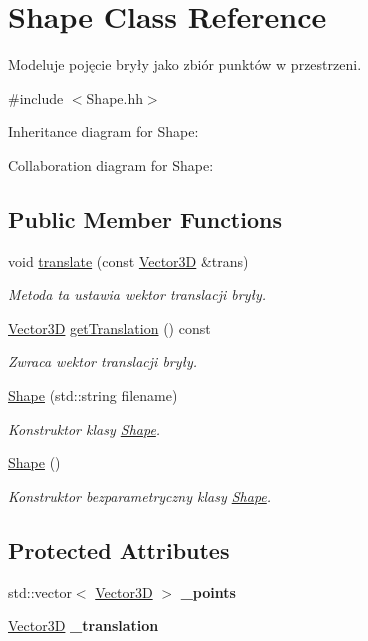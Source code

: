 \hypertarget{class_shape}{}\section{Shape Class Reference}
\label{class_shape}


Modeluje pojęcie bryły jako zbiór punktów w przestrzeni.  




{\ttfamily \#include $<$Shape.\+hh$>$}



Inheritance diagram for Shape\+:


Collaboration diagram for Shape\+:
\subsection*{Public Member Functions}
\begin{DoxyCompactItemize}
\item 
void \hyperlink{class_shape_a87f2bd8b0e83a3d30cb94a13c150823f}{translate} (const \hyperlink{class_vector}{Vector3D} \&trans)
\begin{DoxyCompactList}\small\item\em Metoda ta ustawia wektor translacji bryły. \end{DoxyCompactList}\item 
\hyperlink{class_vector}{Vector3D} \hyperlink{class_shape_a8eadd85a6f07570cab972bd4d22fe835}{get\+Translation} () const
\begin{DoxyCompactList}\small\item\em Zwraca wektor translacji bryły. \end{DoxyCompactList}\item 
\hyperlink{class_shape_a7697a9694ec691492f9dbe117a640f58}{Shape} (std\+::string filename)
\begin{DoxyCompactList}\small\item\em Konstruktor klasy \hyperlink{class_shape}{Shape}. \end{DoxyCompactList}\item 
\hyperlink{class_shape_aaa8d87171e65e0d8ba3c5459978992a7}{Shape} ()
\begin{DoxyCompactList}\small\item\em Konstruktor bezparametryczny klasy \hyperlink{class_shape}{Shape}. \end{DoxyCompactList}\end{DoxyCompactItemize}
\subsection*{Protected Attributes}
\begin{DoxyCompactItemize}
\item 
\mbox{\label{class_shape_a6a334804ee36c2a7dfe1d28fcfec1a67}} 
std\+::vector$<$ \hyperlink{class_vector}{Vector3D} $>$ {\bfseries \+\_\+points}
\item 
\mbox{\label{class_shape_a9a9b788ac911da9996873486f12ccbbb}} 
\hyperlink{class_vector}{Vector3D} {\bfseries \+\_\+translation}
\end{DoxyCompactItemize}


